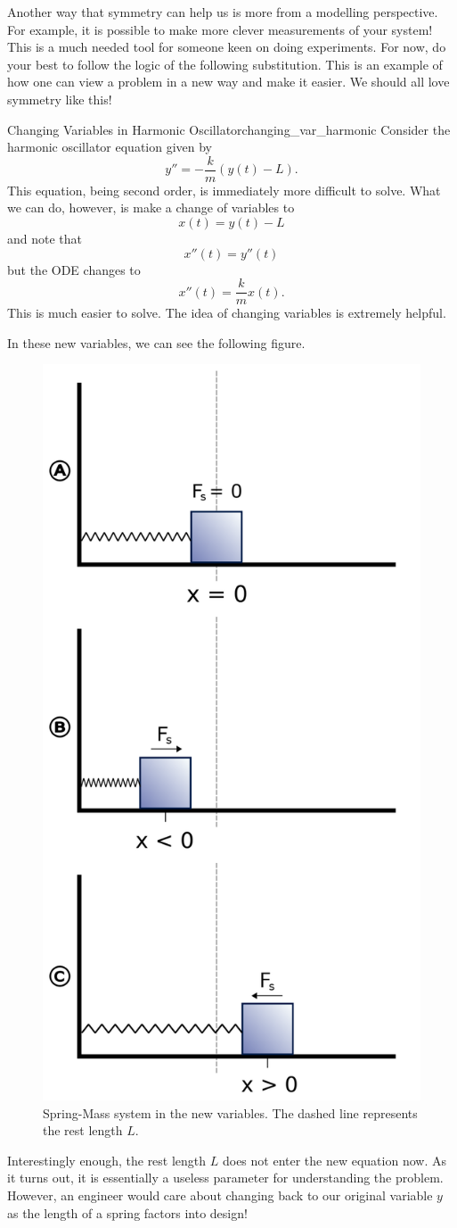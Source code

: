        Another way that symmetry can help us is more from a modelling perspective. For example, it is possible to make more clever measurements of your system! This is a much needed tool for someone keen on doing experiments. For now, do your best to follow the logic of the following substitution.  This is an example of how one can view a problem in a new way and make it easier.  We should all love symmetry like this!

        \begin{ex}{Changing Variables in Harmonic Oscillator}{changing_var_harmonic}
        Consider the harmonic oscillator equation given by
        \[
        y'' = -\frac{k}{m}(y(t)-L).
        \]
        This equation, being second order, is immediately more difficult to solve.  What we can do, however, is make a change of variables to
        \[
        x(t)=y(t)-L
        \]
        and note that
        \[
        x''(t)=y''(t)
        \]
        but the ODE changes to
        \[
        x''(t)=\frac{k}{m}x(t).
        \]
        This is much easier to solve.  The idea of changing variables is extremely helpful.

        In these new variables, we can see the following figure.
        \begin{figure}[H]
            \centering
            \includegraphics[width=.3\textwidth]{Figures/spring-mass.png}
            \caption{Spring-Mass system in the new variables. The dashed line represents the rest length $L$.}
            \label{fig:spring_mass}
        \end{figure}
        Interestingly enough, the rest length $L$ does not enter the new equation now. As it turns out, it is essentially a useless parameter for understanding the problem.  However, an engineer would care about changing back to our original variable $y$ as the length of a spring factors into design!


\end{ex}
